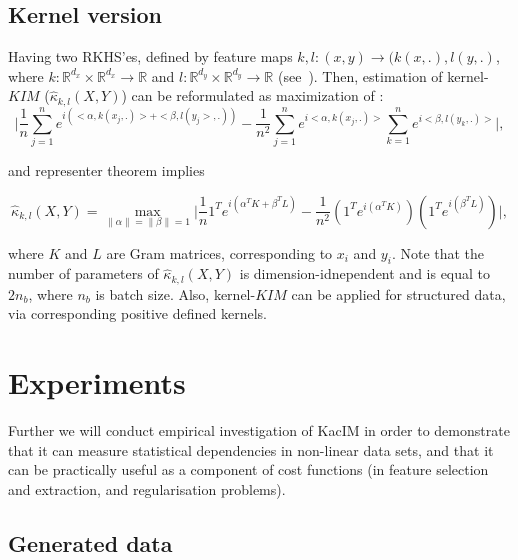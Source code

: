 \documentclass{article}
\begin{document}
\subsection{Kernel version}

Having two RKHS'es, defined by feature maps $k,l: (x,y) \rightarrow (k(x,.), l(y,.)$, where $k: \mathbb{R}^{d_{x}} \times \mathbb{R}^{d_{x}} \rightarrow \mathbb{R}$ and $l: \mathbb{R}^{d_{y}} \times \mathbb{R}^{d_{y}} \rightarrow \mathbb{R}$ (see~\cite{10.5555/3279302}). Then, estimation of kernel-$KIM$ ($\hat{\kappa}_{k,l} (X,Y)$) can be reformulated as maximization of :
\begin{equation}
\label{eq:kernel_estimator}
    \vert \frac{1}{n} \sum_{j=1}^{n} e^{i(<\alpha, k(x_{j},.)> + <\beta, l(y_{j}>,.)) } - \frac{1}{n^2} \sum_{j=1}^{n} e^{i <\alpha, k(x_{j},.)>}\sum_{k=1}^{n} e^{i<\beta, l(y_{k},.)>}\vert,
\end{equation}

and representer theorem\cite{?} implies 

\begin{equation}
\label{eq:kernel_estimator1}
    \hat{\kappa}_{k,l} (X,Y) = \max_{\|\alpha\| = \|\beta\| = 1} \vert \frac{1}{n} 1^{T} e^{i(\alpha^{T} K + \beta^{T} L)} - \frac{1}{n^2} (1^{T} e^{i(\alpha^{T}K)}) (1^{T} e^{i(\beta^{T}L)}) \vert,
\end{equation}

where $K$ and $L$ are Gram matrices, corresponding to $x_{i}$ and $y_{i}$. Note that the number of parameters of $\hat{\kappa}_{k,l} (X,Y)$ is dimension-idnependent and is equal to $2n_{b}$, where $n_{b}$ is batch size. Also, kernel-$KIM$ can be applied for structured data, via corresponding positive defined kernels.

\section{Experiments}
\label{section:experiments}

Further we will conduct empirical investigation of KacIM in order to demonstrate that it can measure statistical dependencies in non-linear data sets, and that it can be practically useful as a component of cost functions (in feature selection and extraction, and regularisation problems).

\subsection{Generated data}
\end{document}
